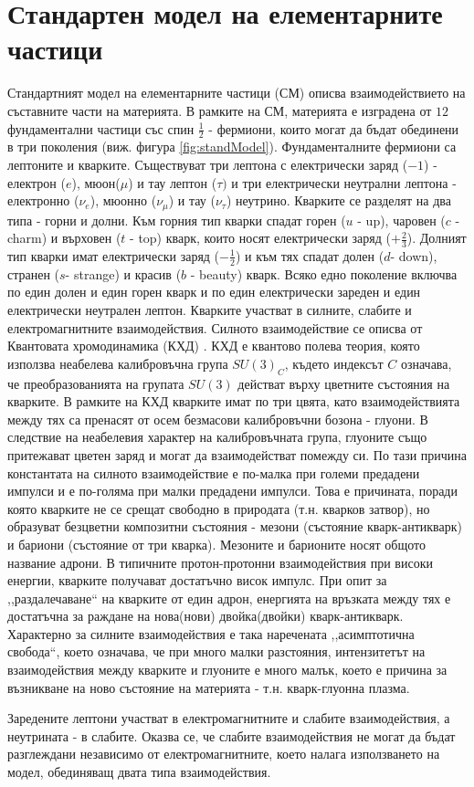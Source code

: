 \section{Стандартен модел на елементарните частици}
\par Стандартният модел на елементарните частици (СМ) \cite{PDG,Pich} описва взаимодействието на съставните части на материята. В рамките на СМ, материята е изградена от $12$ фундаментални частици със спин $\frac{1}{2}$ - фермиони, които могат да бъдат обединени в три поколения (виж. фигура \ref{fig:standModel}). Фундаменталните фермиони са лептоните и кварките. Съществуват три лептона с електрически заряд ($-1$) - електрон ($e$), мюон($\mu$) и тау лептон ($\tau)$ и три електрически неутрални лептона - електронно ($\nu_e$), мюонно ($\nu_{\mu}$) и тау ($\nu_{\tau}$) неутрино. Кварките се разделят на два типа - горни и долни. Към горния тип кварки спадат горен ($u$ - up), чаровен ($c$ - charm) и върховен ($t$ - top) кварк, които носят електрически заряд ($+\frac{2}{3}$). Долният тип кварки имат електрически заряд ($-\frac{1}{2}$) и към тях спадат долен ($d$- down), странен ($s$- strange) и красив ($b$ - beauty) кварк.  Всяко едно поколение включва по един долен и един горен кварк и по един електрически зареден и един електрически неутрален лептон. Кварките участват в силните, слабите и електромагнитните взаимодействия. Силното взаимодействие се описва от Квантовата хромодинамика (КХД) \cite{gellmann,Politzer}. КХД е квантово полева теория, която използва неабелева калибровъчна група $SU(3)_C$, където индексът $C$ означава, че преобразованията на групата $SU(3)$ действат върху цветните състояния на кварките. В рамките на КХД кварките имат по три цвята, като взаимодействията между тях са пренасят от осем безмасови калибровъчни бозона - глуони. В следствие на неабелевия характер на калибровъчната група, глуоните също притежават цветен заряд и могат да взаимодействат помежду си. По тази причина константата на силното взаимодействие е по-малка при големи предадени импулси и е по-голяма при малки предадени импулси. Това е причината, поради която кварките не се срещат свободно в природата (т.н. кварков затвор), но образуват безцветни композитни състояния - мезони (състояние кварк-антикварк) и бариони (състояние от три кварка). Мезоните и барионите носят общото название адрони. В типичните протон-протонни взаимодействия при високи енергии, кварките получават достатъчно висок импулс. При опит за ,,раздалечаване`` на кварките от един адрон, енергията на връзката между тях е достатъчна за раждане на нова(нови) двойка(двойки) кварк-антикварк. Характерно за силните взаимодействия е така наречената ,,асимптотична свобода``, което означава, че при много малки разстояния, интензитетът на взаимодействия между кварките и глуоните е много малък, което е причина за възникване на ново състояние на материята - т.н. кварк-глуонна плазма.
\par Заредените лептони участват в електромагнитните и слабите взаимодействия, а неутрината - в слабите. Оказва се, че слабите взаимодействия не могат да бъдат разглеждани независимо от електромагнитните, което налага използването на модел, обединяващ двата типа взаимодействия.